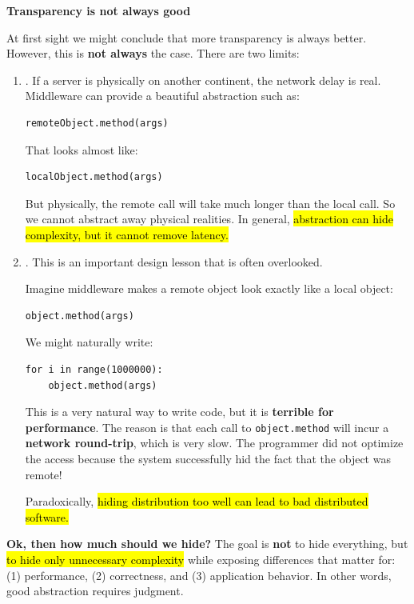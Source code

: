 \newpage

\begin{flushleft}
    \textcolor{Red2}{ \textbf{Transparency is not always good}}
\end{flushleft}
At first sight we might conclude that more transparency is always better. However, this is \textbf{not always} the case. There are two limits:
\begin{enumerate}
    \item {}. If a server is physically on another continent, the network delay is real. Middleware can provide a beautiful abstraction such as:
\begin{lstlisting}
remoteObject.method(args)
\end{lstlisting}
        That looks almost like:
\begin{lstlisting}
localObject.method(args)
\end{lstlisting}
        But physically, the remote call will take much longer than the local call. So we cannot abstract away physical realities. In general, \hl{abstraction can hide complexity, but it cannot remove latency.}

    \item {}. This is an important design lesson that is often overlooked.

        \highspace
        Imagine middleware makes a remote object look exactly like a local object:
\begin{lstlisting}
object.method(args)
\end{lstlisting}
        We might naturally write:
\begin{lstlisting}
for i in range(1000000):
    object.method(args)
\end{lstlisting}
        This is a very natural way to write code, but it is \textbf{terrible for performance}. The reason is that each call to \texttt{object.method} will incur a \textbf{network round-trip}, which is very slow. The programmer did not optimize the access because the system successfully hid the fact that the object was remote!

        \highspace
        Paradoxically, \hl{hiding distribution too well can lead to bad distributed software.}
\end{enumerate}
\textcolor{Green3}{ \textbf{Ok, then how much should we hide?}} The goal is \textbf{not} to hide everything, but \hl{to hide only unnecessary complexity} while exposing differences that matter for: (1) performance, (2) correctness, and (3) application behavior. In other words, good abstraction requires judgment.

